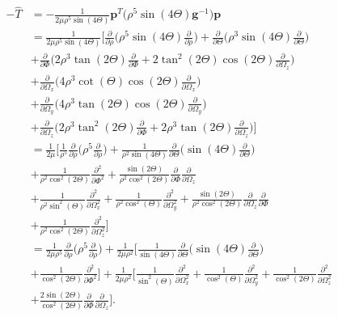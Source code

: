 \documentclass{article}
\begin{document}
\begin{align*}
	-\hat{T} &= -\frac{1}{2\mu \rho^5 \sin(4\Theta)} \bm{p}^T \Big(\rho^5 \sin(4\Theta) \bm{g}^{-1}\Big) \bm{p}\\
	  &= \frac{1}{2\mu \rho^5 \sin(4\Theta)}\Bigg[ \frac{\partial}{\partial \rho} \Bigg(\rho^5 \sin(4 \Theta) \frac{\partial}{\partial \rho}\Bigg) + \frac{\partial}{\partial \Theta}\Bigg(\rho^3\sin(4\Theta)\frac{\partial}{\partial\Theta}\Bigg)\\ &+\frac{\partial}{\partial\Phi}\Bigg(2\rho^3\tan(2\Theta)\frac{\partial}{\partial\Phi} + 2\tan^2(2\Theta)\cos(2\Theta)\frac{\partial}{\partial\Omega_z}\Bigg)\\
	  &+\frac{\partial}{\partial\Omega_x}\Bigg(4\rho^3\cot(\Theta)\cos(2\Theta)\frac{\partial}{\partial\Omega_x}\Bigg)\\
	  &+\frac{\partial}{\partial\Omega_y}\Bigg(4\rho^3\tan(2\Theta)\cos(2\Theta)\frac{\partial}{\partial\Omega_y}\Bigg)\\
	  &+\frac{\partial}{\partial\Omega_z}\Bigg(2\rho^3\tan^2(2\Theta)\frac{\partial}{\partial\Phi}+2\rho^3\tan(2\Theta)\frac{\partial}{\partial\Omega_z}\Bigg)\Bigg]\\
	  &=\frac{1}{2\mu}\Bigg[\frac{1}{\rho^5}\frac{\partial}{\partial\rho}\Bigg(\rho^5\frac{\partial}{\partial\rho}\Bigg) + \frac{1}{\rho^2\sin(4\Theta)}\frac{\partial}{\partial\Theta}\Bigg(\sin(4\Theta)\frac{\partial}{\partial\Theta}\Bigg)\\
	  &+\frac{1}{\rho^2\cos^2(2\Theta)}\frac{\partial^2}{\partial\Phi^2} + \frac{\sin(2\Theta)}{\rho^2\cos^2(2\Theta)}\frac{\partial}{\partial\Phi}\frac{\partial}{\partial\Omega_z}\\
	  &+\frac{1}{\rho^2\sin^2(\Theta)}\frac{\partial^2}{\partial\Omega^2_x} + \frac{1}{\rho^2\cos^2(\Theta)}\frac{\partial^2}{\partial\Omega^2_y} + \frac{\sin(2\Theta)}{\rho^2\cos^2(2\Theta)}\frac{\partial}{\partial\Omega_z}\frac{\partial}{\partial\Phi}\\
	  &+ \frac{1}{\rho^2\cos^2(2\Theta)}\frac{\partial^2}{\partial\Omega^2_z}\Bigg]\\
	  &=\frac{1}{2\mu\rho^5}\frac{\partial}{\partial\rho}\Bigg(\rho^5\frac{\partial}{\partial\rho}\Bigg) + \frac{1}{2\mu\rho^2}\Bigg[\frac{1}{\sin(4\Theta)}\frac{\partial}{\partial\Theta}\Bigg(\sin(4\Theta)\frac{\partial}{\partial\Theta}\Bigg)\\
	  &+\frac{1}{\cos^2(2\Theta)}\frac{\partial^2}{\partial\Phi^2} \Bigg]+\frac{1}{2\mu\rho^2}\Bigg[\frac{1}{\sin^2(\Theta)}\frac{\partial^2}{\partial\Omega^2_x} + \frac{1}{\cos^2(\Theta)}\frac{\partial^2}{\partial\Omega^2_y} + \frac{1}{\cos^2(2\Theta)}\frac{\partial^2}{\partial\Omega^2_z}\\
	  &+ \frac{2\sin(2\Theta)}{\cos^2(2\Theta)}\frac{\partial}{\partial\Phi}\frac{\partial}{\partial\Omega_z}\Bigg].
\end{align*}
\end{document}
